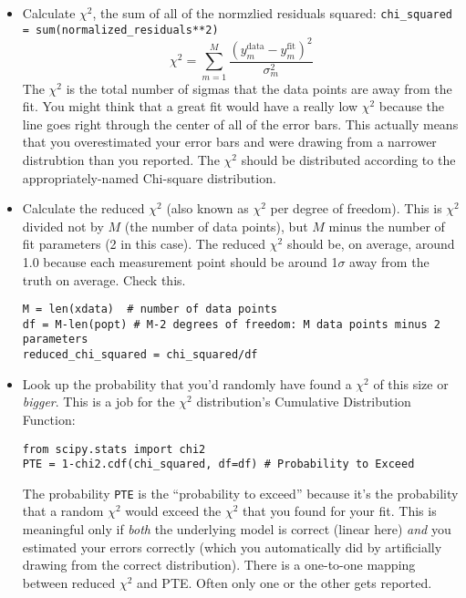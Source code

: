 \documentclass[11pt]{hmcpset}
\begin{document}
\pagebreak
\begin{problem}

	\begin{itemize}
		\item Calculate $\chi^2$, the sum of all of the normzlied residuals squared: \texttt{chi\_squared = sum(normalized\_residuals**2)}
		\vspace{-1em}
		\[
		\chi^2 = \sum_{m=1}^M \frac{(y^\mathrm{data}_m-y^\mathrm{fit}_m)^2}{\sigma_m^2}
		\]
		The $\chi^2$ is the total number of sigmas that the data points are away from the fit. You might think that a great fit would have a really low $\chi^2$ because the line goes right through the center of all of the error bars. This actually means that you overestimated your error bars and were drawing from a narrower distrubtion than you reported.
		The $\chi^2$ should be distributed according to the appropriately-named Chi-square distribution.
		\item Calculate the reduced $\chi^2$ (also known as $\chi^2$ per degree of freedom). This is $\chi^2$ divided not by $M$ (the number of data points), but $M$ minus the number of fit parameters (2 in this case). The reduced $\chi^2$ should be, on average, around 1.0 because each measurement point should be around 1$\sigma$ away from the truth on average. Check this.
\begin{lstlisting}[style=Python]
M = len(xdata)  # number of data points
df = M-len(popt) # M-2 degrees of freedom: M data points minus 2 parameters
reduced_chi_squared = chi_squared/df
\end{lstlisting}
		\item Look up the probability that you'd randomly have found a $\chi^2$ of this size or \textit{bigger}. This is a job for the $\chi^2$ distribution's Cumulative Distribution Function:
\begin{lstlisting}[style=Python]
from scipy.stats import chi2
PTE = 1-chi2.cdf(chi_squared, df=df) # Probability to Exceed
\end{lstlisting}
	    The probability \texttt{PTE} is the ``probability to exceed'' because it's the probability that a random $\chi^2$ would exceed the $\chi^2$ that you found for your fit. This is meaningful only if \textit{both} the underlying model is correct (linear here) \textit{and} you estimated your errors correctly (which you automatically did by artificially drawing from the correct distribution). There is a one-to-one mapping between reduced $\chi^2$ and PTE. Often only one or the other gets reported.

\end{itemize}
\end{problem}
\end{document}
